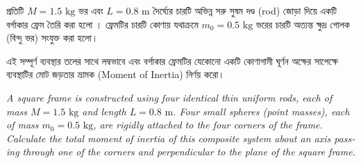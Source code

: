 \documentclass[12pt, a4paper]{article}
\begin{document}
\begin{tcolorbox}[questionbox={প্রশ্ন (Question) 9}]
\noindent
প্রতিটি $M = 1.5\text{ kg}$ ভর এবং $L = 0.8\text{ m}$ দৈর্ঘ্যের চারটি অভিন্ন সরু সুষম দণ্ড (rod) জোড়া দিয়ে একটি বর্গাকার ফ্রেম তৈরি করা হলো । ফ্রেমটির চারটি কোণায় যথাক্রমে $m_0 = 0.5\text{ kg}$ ভরের চারটি অত্যন্ত ক্ষুদ্র গোলক (বিন্দু ভর) সংযুক্ত করা হলো। 

\vspace{0.3em}
\noindent
এই সম্পূর্ণ ব্যবস্থার তলের সাথে লম্বভাবে এবং বর্গাকার ফ্রেমটির যেকোনো একটি কোণাগামী ঘূর্ণন অক্ষের সাপেক্ষে ব্যবস্থাটির মোট জড়তার ভ্রামক (Moment of Inertia) নির্ণয় করো।

\vspace{0.8em}
\begin{english}
\noindent\textit{\color{darkgray}
A square frame is constructed using four identical thin uniform rods, each of mass $M = 1.5\text{ kg}$ and length $L = 0.8\text{ m}$. Four small spheres (point masses), each of mass $m_0 = 0.5\text{ kg}$, are rigidly attached to the four corners of the frame. Calculate the total moment of inertia of this composite system about an axis passing through one of the corners and perpendicular to the plane of the square frame.
}
\end{english}
\end{tcolorbox}
\end{document}
